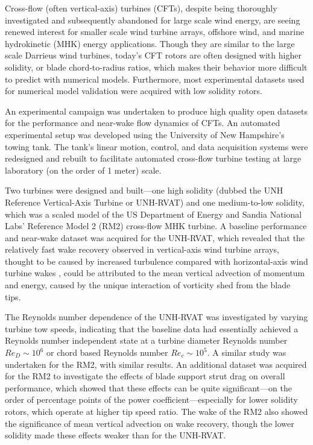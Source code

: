 \begin{Abstractpage}

\setlength{\baselineskip}{1.5\baselineskip}
{

Cross-flow (often vertical-axis) turbines (CFTs), despite being thoroughly
investigated and subsequently abandoned for large scale wind energy, are seeing
renewed interest for smaller scale wind turbine arrays, offshore wind, and
marine hydrokinetic (MHK) energy applications. Though they are similar to the
large scale Darrieus wind turbines, today's CFT rotors are often designed with
higher solidity, or blade chord-to-radius ratios, which makes their behavior
more difficult to predict with numerical models. Furthermore, most experimental
datasets used for numerical model validation were acquired with low solidity
rotors.

An experimental campaign was undertaken to produce high quality open datasets
for the performance and near-wake flow dynamics of CFTs. An automated
experimental setup was developed using the University of New Hampshire's towing
tank. The tank's linear motion, control, and data acquisition systems were
redesigned and rebuilt to facilitate automated cross-flow turbine testing at
large laboratory (on the order of 1 meter) scale.

Two turbines were designed and built---one high solidity (dubbed the UNH
Reference Vertical-Axis Turbine or UNH-RVAT) and one medium-to-low solidity,
which was a scaled model of the US Department of Energy and Sandia National
Labs' Reference Model 2 (RM2) cross-flow MHK turbine. A baseline performance and
near-wake dataset was acquired for the UNH-RVAT, which revealed that the
relatively fast wake recovery observed in vertical-axis wind turbine arrays,
thought to be caused by increased turbulence compared with horizontal-axis wind
turbine wakes \cite{Kinzel2012}, could be attributed to the mean vertical
advection of momentum and energy, caused by the unique interaction of vorticity
shed from the blade tips.

The Reynolds number dependence of the UNH-RVAT was investigated by varying
turbine tow speeds, indicating that the baseline data had essentially achieved a
Reynolds number independent state at a turbine diameter Reynolds number $Re_D
\sim 10^6$ or chord based Reynolds number $Re_c \sim 10^5$. A similar study was
undertaken for the RM2, with similar results. An additional dataset was acquired
for the RM2 to investigate the effects of blade support strut drag on overall
performance, which showed that these effects can be quite significant---on the
order of percentage points of the power coefficient---especially for lower
solidity rotors, which operate at higher tip speed ratio. The wake of the RM2
also showed the significance of mean vertical advection on wake recovery, though
the lower solidity made these effects weaker than for the UNH-RVAT.

}
\end{Abstractpage}
